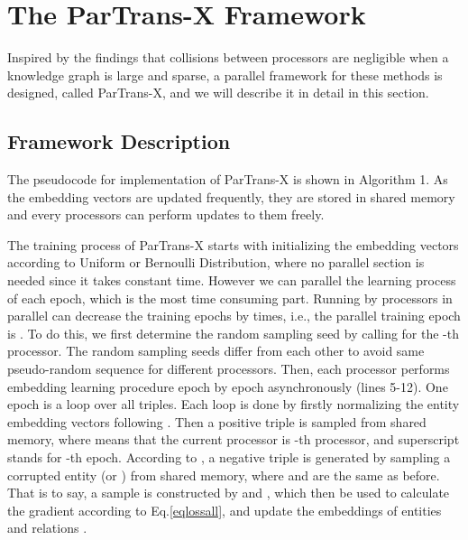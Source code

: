 \documentclass[sigconf]{acmart}
\begin{document}
\section{The ParTrans-X Framework}

Inspired by the findings that collisions between processors are negligible when a knowledge graph is large and sparse, a parallel framework for these methods is designed, called ParTrans-X, and we will describe it in detail in this section. 

\subsection{Framework Description}

The pseudocode for implementation of ParTrans-X is shown in Algorithm 1.
As the embedding vectors are updated frequently, they are stored in shared memory and every processors can perform updates to them freely. 

The training process of ParTrans-X starts with initializing the embedding vectors according to Uniform or Bernoulli Distribution, where no parallel section is needed since it takes constant time.  
However we can parallel the learning process of each epoch, which is the most time consuming part. Running by  processors in parallel can decrease the training epochs by  times, i.e., the parallel training epoch is . To do this, we first determine the random sampling seed  by calling  for the -th processor. The random sampling seeds differ from each other 
to avoid same pseudo-random sequence for different processors.
Then, each processor performs embedding learning procedure epoch by epoch asynchronously (lines 5-12). One epoch is a loop over all triples. Each loop is done by firstly normalizing the entity embedding vectors following \cite{bordes2013translating}. Then a positive triple  is sampled from shared memory, where  means that the current processor is -th processor, and superscript  stands for -th epoch. According to , a negative triple  is generated by sampling a corrupted entity  (or ) from shared memory, where  and  are the same as before. That is to say, a sample  is constructed by  and , which then be used to calculate the gradient  according to Eq.\eqref{eqlossall}, and update the embeddings of entities and relations .
\end{document}
